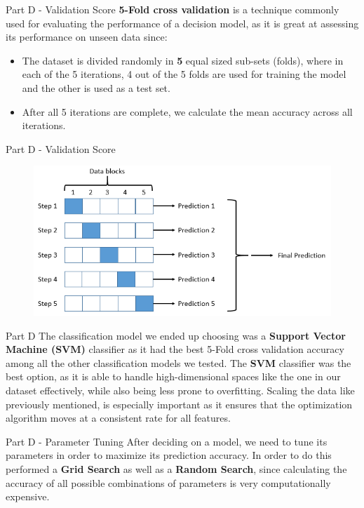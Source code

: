 \documentclass{beamer}
\begin{document}
    \begin{frame}{Part D - Validation Score}
    \textbf{5-Fold cross validation} is a technique commonly used for evaluating the performance of a decision model,
    as it is great at assessing its performance on unseen data since:
    \begin{itemize}
        \item The dataset is divided randomly in \textbf{5} equal sized sub-sets (folds), where in each of the 5 iterations,
        4 out of the 5 folds are used for training the model and the other is used as a test set.
        \item After all 5 iterations are complete, we calculate the mean accuracy across all iterations.
    \end{itemize}
    \end{frame}

    \begin{frame}{Part D - Validation Score}
    \begin{figure}
        \centering
        \includegraphics[width=0.75\linewidth]{D1.png}
        \label{Graph A2}
    \end{figure}
    \end{frame}

    \begin{frame}{Part D}
    The classification model we ended up choosing was a \textbf{Support Vector Machine (SVM)} classifier as it had the best 5-Fold
    cross validation accuracy among all the other classification models we tested. The \textbf{SVM} classifier was the best option,
    as it is able to handle high-dimensional spaces like the one in our dataset effectively, while also being less prone to
    overfitting. Scaling the data like previously mentioned, is especially important as it ensures that the optimization
    algorithm moves at a consistent rate for all features.
    \end{frame}

    \begin{frame}{Part D - Parameter Tuning}
    After deciding on a model, we need to tune its parameters in order to maximize its prediction accuracy. 
    In order to do this performed a \textbf{Grid Search} as well as a \textbf{Random Search}, since calculating
    the accuracy of all possible combinations of parameters is very computationally expensive.
    \end{frame}
\end{document}
